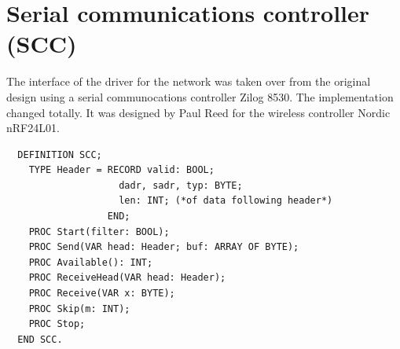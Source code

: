 \section{Serial communications controller (SCC)}
The interface of the driver for the network was taken over from the original design using
a serial communocations controller Zilog 8530. The implementation changed totally. It was
designed by Paul Reed for the wireless controller Nordic nRF24L01.
\begin{verbatim}
  DEFINITION SCC;
    TYPE Header = RECORD valid: BOOL;
                    dadr, sadr, typ: BYTE;
                    len: INT; (*of data following header*)
                  END;
    PROC Start(filter: BOOL);
    PROC Send(VAR head: Header; buf: ARRAY OF BYTE);
    PROC Available(): INT;
    PROC ReceiveHead(VAR head: Header);
    PROC Receive(VAR x: BYTE);
    PROC Skip(m: INT);
    PROC Stop;
  END SCC.
\end{verbatim}
